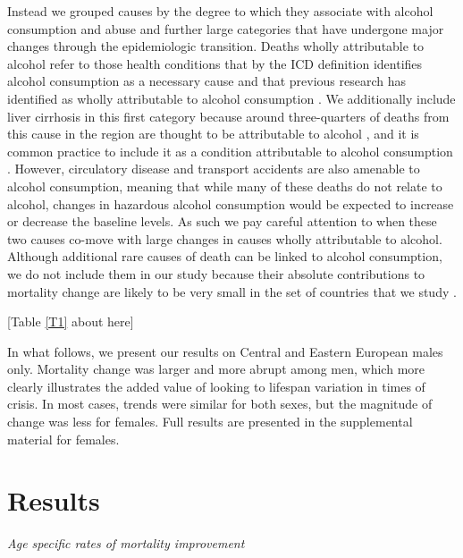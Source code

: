 \documentclass{article}
\begin{document}
\begin{spacing}{1.5}
{Instead we grouped causes by the degree to which they associate with alcohol consumption and abuse and further large categories that have undergone major changes through the epidemiologic transition.  Deaths wholly attributable to alcohol refer to those health conditions that by the ICD definition identifies alcohol consumption as a necessary cause and that previous research has identified as wholly attributable to alcohol consumption \citep{rehm2010relation}. We additionally include liver cirrhosis in this first category because around three-quarters of deaths from this cause in the region are thought to be attributable to alcohol \citep{rehm2003relationship}, and it is common practice to include it as a condition attributable to alcohol consumption \citep{rehm2003relationship,rehm2010relation}. However, circulatory disease and transport accidents are also amenable to alcohol consumption, meaning that while many of these deaths do not relate to alcohol, changes in hazardous alcohol consumption would be expected to increase or decrease the baseline levels.  As such we pay careful attention to when these two causes co-move with large changes in causes wholly attributable to alcohol. Although additional rare causes of death can be linked to alcohol consumption, we do not include them in our study because their absolute contributions to mortality change are likely to be very small in the set of countries that we study \citep{grigoriev2015}.\\
}

\begin{center}
[Table \ref{T1} about here]
\end{center}



In what follows, we present our results on \textcolor[rgb]{1,0,0}{Central and }Eastern European males only. \textcolor[rgb]{1,0,0}{Mortality change was larger and more abrupt among men}, which more clearly illustrates the added value of looking to lifespan variation in times of crisis. In most cases, trends were similar for both sexes, but the magnitude of change was less for females. Full results are presented in the supplemental material for females.\\



\section*{Results}
\emph{Age specific rates of mortality improvement}\\


\end{spacing}
\end{document}
